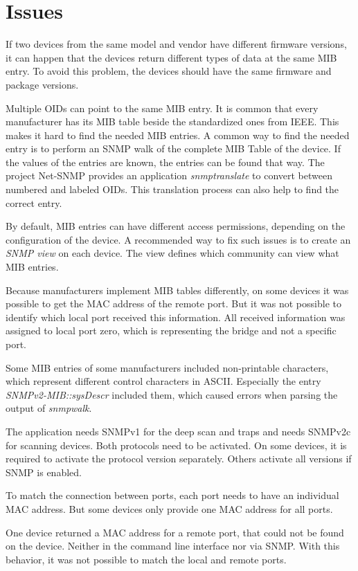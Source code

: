 \section{Issues}
\label{Section:CAF-Issues}

If two devices from the same model and vendor have different firmware versions, it can happen that the devices return different types of data at the same MIB entry. To avoid this problem, the devices should have the same firmware and package versions.

Multiple OIDs can point to the same MIB entry. It is common that every manufacturer has its MIB table beside the standardized ones from IEEE. This makes it hard to find the needed MIB entries. A common way to find the needed entry is to perform an SNMP walk of the complete MIB Table of the device. If the values of the entries are known, the entries can be found that way. The project Net-SNMP provides an application \textit{snmptranslate} to convert between numbered and labeled OIDs. This translation process can also help to find the correct entry.

By default, MIB entries can have different access permissions, depending on the configuration of the device. A recommended way to fix such issues is to create an \textit{SNMP view} on each device. The view defines which community can view what MIB entries.

Because manufacturers implement MIB tables differently, on some devices it was possible to get the MAC address of the remote port. But it was not possible to identify which local port received this information. All received information was assigned to local port zero, which is representing the bridge and not a specific port.

Some MIB entries of some manufacturers included non-printable characters, which represent different control characters in ASCII. Especially the entry \textit{SNMPv2-MIB::sysDescr} included them, which caused errors when parsing the output of \textit{snmpwalk}.

The application needs SNMPv1 for the deep scan and traps and needs SNMPv2c for scanning devices. Both protocols need to be activated. On some devices, it is required to activate the protocol version separately. Others activate all versions if SNMP is enabled.

To match the connection between ports, each port needs to have an individual MAC address. But some devices only provide one MAC address for all ports.

One device returned a MAC address for a remote port, that could not be found on the device. Neither in the command line interface nor via SNMP. With this behavior, it was not possible to match the local and remote ports.

